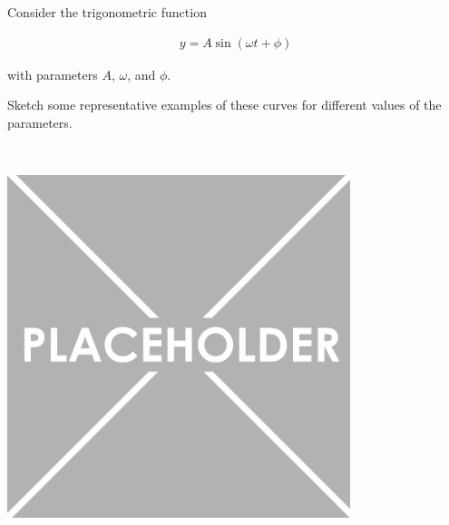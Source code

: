 Consider the trigonometric function

\begin{align*}
    y = A\sin{\left( \omega t + \phi \right)}
\end{align*}

with parameters $A$, $\omega$, and $\phi$.

Sketch some representative examples of these curves for different values of the parameters.

\begin{solution}\ \\
\begin{center}
    \includegraphics[width=0.75\textwidth]{img/placeholder.png}
\end{center}
\end{solution}